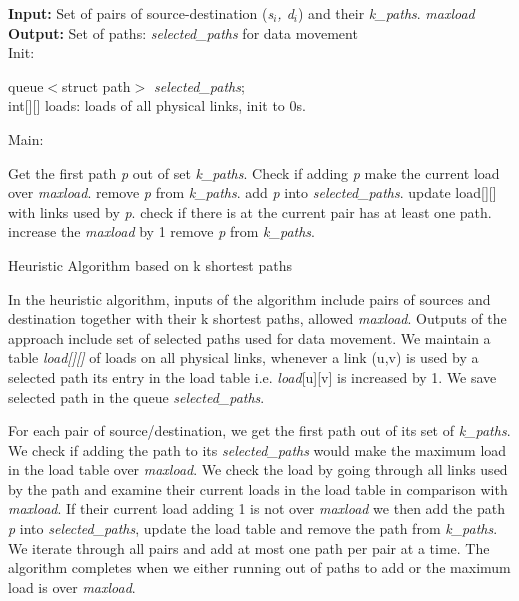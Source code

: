\begin{algorithm}[!htbp]
\textbf{Input:} Set of pairs of source-destination (\textit{s$_i$, d$_i$}) and their \textit{k\_paths}. \textit{maxload}\\
\textbf{Output:} Set of paths: \textit{selected\_paths} for data movement\\
Init:
    \begin{algorithmic}
        \State queue$<$struct path$>$ \textit{selected\_paths};\\
	int[][] loads: loads of all physical links, init to 0s.\\
    \end{algorithmic}
Main:
\begin{algorithmic}
	    \State Get the first path \textit{p} out of set \textit{k\_paths}.
	    \State Check if adding \textit{p} make the current load over \textit{maxload}.
		\State remove \textit{p} from \textit{k\_paths}.
		\State add \textit{p} into \textit{selected\_paths}.
		\State update load[][] with links used by \textit{p}.
	    \Else 
		\State check if there is at the current pair has at least one path.
		    \State increase the \textit{maxload} by 1
		\Else
		    \State remove \textit{p} from \textit{k\_paths}.
		\EndIf
	    \EndIf
	\EndFor
	\EndWhile
    \EndFunction
\end{algorithmic}

\caption{Heuristic Algorithm based on k shortest paths}
\label{alg:heu}

\end{algorithm}

In the heuristic algorithm, inputs of the algorithm include pairs of sources and destination together with their k shortest paths, allowed \textit{maxload}. Outputs of the approach include set of selected paths used for data movement. We maintain a table \textit{load[][]} of loads on all physical links, whenever a link (u,v) is used by a selected path its entry in the load table i.e. \textit{load}[u][v] is increased by 1. We save selected path in the queue \textit{selected\_paths}.

For each pair of source/destination, we get the first path out of its set of \textit{k\_paths}. We check if adding the path to its \textit{selected\_paths} would make the maximum load in the load table over \textit{maxload}. We check the load by going through all links used by the path and examine their current loads in the load table in comparison with \textit{maxload}. If their current load adding 1 is not over \textit{maxload} we then add the path \textit{p} into \textit{selected\_paths}, update the load table and remove the path from \textit{k\_paths}. We iterate through all pairs and add at most one path per pair at a time. The algorithm completes when we either running out of paths to add or the maximum load is over \textit{maxload}.

